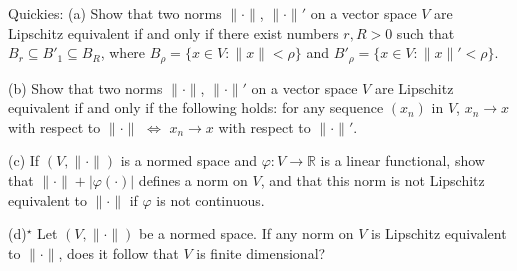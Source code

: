 Quickies: (a) Show that two norms $\|\cdot\|$, $\|\cdot\|'$ on a vector space $V$ are Lipschitz equivalent if and only if there exist numbers $r,R>0$ such that $B_r\subseteq B'_1\subseteq B_R$, where $B_\rho=\{x\in V:\|x\|<\rho\}$ and $B'_\rho=\{x\in V:\|x\|'<\rho\}$.

(b) Show that two norms $\|\cdot\|$, $\|\cdot\|'$ on a vector space $V$ are Lipschitz equivalent if and only if the following holds: for any sequence $(x_n)$ in $V$, $x_n\to x$ with respect to $\|\cdot\|$ $\Longleftrightarrow$ $x_n\to x$ with respect to $\|\cdot\|'$.

(c) If $(V,\|\cdot\|)$ is a normed space and $\varphi:V\to\mathbb R$ is a linear functional, show that $\|\cdot\|+|\varphi(\cdot)|$ defines a norm on $V$, and that this norm is not Lipschitz equivalent to $\|\cdot\|$ if $\varphi$ is not continuous.

(d)$^\star$ Let $(V,\|\cdot\|)$ be a normed space. If any norm on $V$ is Lipschitz equivalent to $\|\cdot\|$, does it follow that $V$ is finite dimensional?
